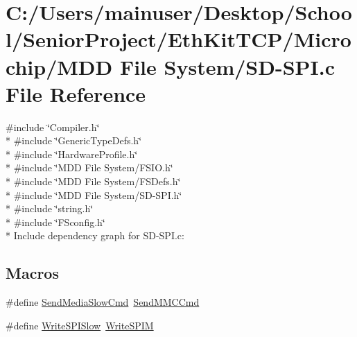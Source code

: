 \hypertarget{_s_d-_s_p_i_8c}{}\section{C\+:/\+Users/mainuser/\+Desktop/\+School/\+Senior\+Project/\+Eth\+Kit\+T\+C\+P/\+Microchip/\+M\+D\+D File System/\+S\+D-\/\+S\+P\+I.c File Reference}
\label{_s_d-_s_p_i_8c}
{\ttfamily \#include \char`\"{}Compiler.\+h\char`\"{}}\\*
{\ttfamily \#include \char`\"{}Generic\+Type\+Defs.\+h\char`\"{}}\\*
{\ttfamily \#include \char`\"{}Hardware\+Profile.\+h\char`\"{}}\\*
{\ttfamily \#include \char`\"{}M\+D\+D File System/\+F\+S\+I\+O.\+h\char`\"{}}\\*
{\ttfamily \#include \char`\"{}M\+D\+D File System/\+F\+S\+Defs.\+h\char`\"{}}\\*
{\ttfamily \#include \char`\"{}M\+D\+D File System/\+S\+D-\/\+S\+P\+I.\+h\char`\"{}}\\*
{\ttfamily \#include \char`\"{}string.\+h\char`\"{}}\\*
{\ttfamily \#include \char`\"{}F\+Sconfig.\+h\char`\"{}}\\*
Include dependency graph for S\+D-\/\+S\+P\+I.c\+:
\subsection*{Macros}
\begin{DoxyCompactItemize}
\item 
\#define \hyperlink{_s_d-_s_p_i_8c_a5d378e74d32d2c729f8c02e1038fcd4a}{Send\+Media\+Slow\+Cmd}~\hyperlink{_s_d-_s_p_i_8c_a88d057eb424e5ae206be5465387b2e0a}{Send\+M\+M\+C\+Cmd}
\item 
\#define \hyperlink{_s_d-_s_p_i_8c_ac8426536455869c8e1fac618a62fb708}{Write\+S\+P\+I\+Slow}~\hyperlink{_s_d-_s_p_i_8c_ab4e7f228a81fb435b37e82b99fb27bb5}{Write\+S\+P\+I\+M}
\end{DoxyCompactItemize}
